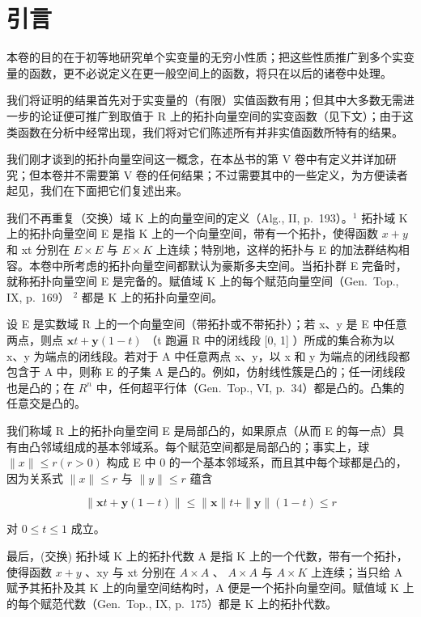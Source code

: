 \chapter*{引言}
{}

本卷的目的在于初等地研究单个实变量的无穷小性质；把这些性质推广到多个实变量的函数，更不必说定义在更一般空间上的函数，将只在以后的诸卷中处理。

我们将证明的结果首先对于实变量的（有限）实值函数有用；但其中大多数无需进一步的论证便可推广到取值于 R 上的拓扑向量空间的实变函数（见下文）；由于这类函数在分析中经常出现，我们将对它们陈述所有并非实值函数所特有的结果。

我们刚才谈到的拓扑向量空间这一概念，在本丛书的第 V 卷中有定义并详加研究；但本卷并不需要第 V 卷的任何结果；不过需要其中的一些定义，为方便读者起见，我们在下面把它们复述出来。

我们不再重复（交换）域 K 上的向量空间的定义（Alg., II, p.~193）。\(^{1}\) 拓扑域 K 上的拓扑向量空间 E 是指 K 上的一个向量空间，带有一个拓扑，使得函数 \(x + y\) 和 xt 分别在 \(E \times E\) 与 \(E \times K\) 上连续；特别地，这样的拓扑与 E 的加法群结构相容。本卷中所考虑的拓扑向量空间都默认为豪斯多夫空间。当拓扑群 E 完备时，就称拓扑向量空间 E 是完备的。赋值域 K 上的每个赋范向量空间（Gen.~Top., IX, p.~169） \(^{2}\) 都是 K 上的拓扑向量空间。

设 E 是实数域 R 上的一个向量空间（带拓扑或不带拓扑）；若 x、y 是 E 中任意两点，则点 \(\mathbf{x}t + \mathbf{y}(1 - t)\) （t 跑遍 R 中的闭线段 {[}0, 1{]} ）所成的集合称为以 x、y 为端点的闭线段。若对于 A 中任意两点 x、y，以 x 和 y 为端点的闭线段都包含于 A 中，则称 E 的子集 A 是凸的。例如，仿射线性簇是凸的；任一闭线段也是凸的；在 \(R^{n}\) 中，任何超平行体（Gen.~Top., VI, p.~34）都是凸的。凸集的任意交是凸的。

我们称域 R 上的拓扑向量空间 E 是局部凸的，如果原点（从而 E 的每一点）具有由凸邻域组成的基本邻域系。每个赋范空间都是局部凸的；事实上，球 \(\|x\| \leqslant r (r > 0)\) 构成 E 中 0 的一个基本邻域系，而且其中每个球都是凸的，因为关系式 \(\|x\| \leqslant r\) 与 \(\|y\| \leqslant r\) 蕴含

\[
\| \mathbf {x} t + \mathbf {y} (1 - t) \| \leqslant \| \mathbf {x} \| t + \| \mathbf {y} \| (1 - t) \leqslant r
\]

对 \(0 \leqslant t \leqslant 1\) 成立。

最后，(交换) 拓扑域 K 上的拓扑代数 A 是指 K 上的一个代数，带有一个拓扑，使得函数 \(x + y\) 、xy 与 xt 分别在 \(A \times A\) 、 \(A \times A\) 与 \(A \times K\) 上连续；当只给 A 赋予其拓扑及其 K 上的向量空间结构时，A 便是一个拓扑向量空间。赋值域 K 上的每个赋范代数（Gen.~Top., IX, p.~175）都是 K 上的拓扑代数。

